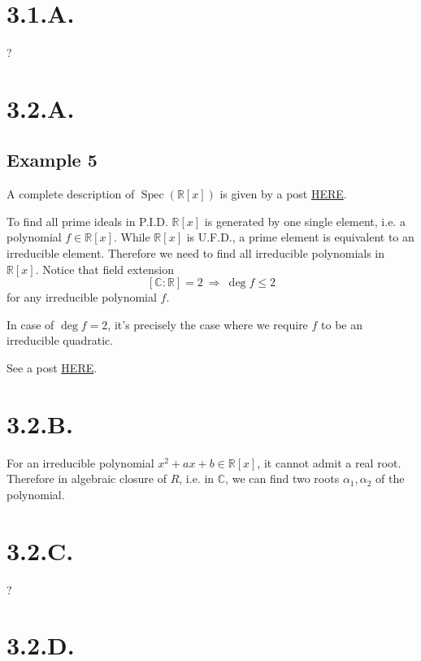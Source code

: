 \section{3.1.A.}

?

\section{3.2.A.}

\subsection{Example 5}

A complete description of $\operatorname{Spec}(\mathbb R[x])$ is given by a post \href{https://math.stackexchange.com/questions/1057642/describe-the-topology-of-spec-mathbbrx}{HERE}.

To find all prime ideals in P.I.D. $\mathbb R[x]$ is generated by one single element, i.e. a polynomial $f\in \mathbb R[x]$. While $\mathbb R[x]$ is U.F.D., a prime element is equivalent to an irreducible element. Therefore we need to find all irreducible polynomials in $\mathbb R[x]$. Notice that field extension 
\[[\mathbb C:\mathbb R]=2 ~\Rightarrow~ \operatorname{deg} f\leq 2\] for any irreducible polynomial $f$. 

In case of $\operatorname{deg} f=2$, it's precisely the case where we require $f$ to be an irreducible quadratic. 

See a post \href{https://math.stackexchange.com/questions/2127249/what-are-the-irreducible-elements-in-mathbbrx-and-mathbbcx}{HERE}.

\section{3.2.B.}

For an irreducible polynomial $x^2+ax+b\in\mathbb R[x]$, it cannot admit a real root. Therefore in algebraic closure of $R$, i.e. in $\mathbb C$, we can find two roots $\alpha_1,\alpha_2$ of the polynomial. 

\section{3.2.C.}

?

\section{3.2.D.}

